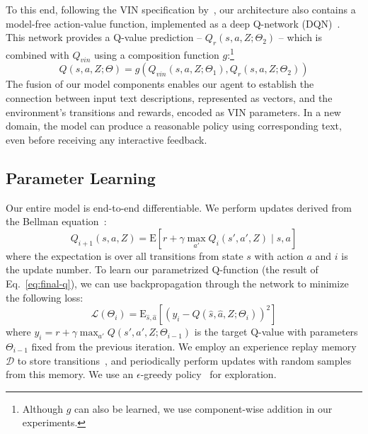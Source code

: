To this end, following the VIN specification by~, our architecture also contains a model-free action-value function, implemented as a deep Q-network (DQN)~\cite{mnih2015dqn}. This network provides a Q-value prediction -- $Q_{r} (s,a,Z; \Theta_2)$ -- which is combined with $Q_{vin}$ using a composition function $g$:\footnote{Although $g$ can also be learned, we use component-wise addition in our experiments.}
\begin{dmath}
Q(s, a, Z; \Theta) = g(Q_{vin}(s, a, Z; \Theta_1), Q_{r}(s, a, Z; \Theta_2))
\label{eq:final-q}
\end{dmath}
The fusion of our model components enables our agent to establish the connection between input text descriptions, represented as vectors, and the environment's transitions and rewards, encoded as VIN parameters. In a new domain, the model can produce a reasonable policy using corresponding text, even before receiving any interactive feedback.


\subsection{Parameter Learning}
Our entire model is end-to-end differentiable. We perform updates derived from the Bellman equation~\cite{sutton1998introduction}:
\begin{dmath}
	{Q_{i+1}(s,a, Z) = \mathrm{E}[r + \gamma \max_{a'} Q_i(s',a', Z) \mid s, a]} 
\label{eq:transfer-bellman-update}
\end{dmath}
where the expectation is over all transitions from state $s$ with action $a$ and $i$ is the update number. To learn our parametrized Q-function (the result of Eq.~\ref{eq:final-q}), we can use backpropagation through the network to minimize the following loss:
\begin{dmath}
	{\mathcal{L}(\Theta_i) = \mathrm{E}_{\hat{s},\hat{a}}  [ (y_i - Q(\hat{s}, \hat{a}, Z ; \Theta_i))^2 ]}
\label{eq:transfer-loss}
\end{dmath}
where $ {y_i = r + \gamma \max_{a'} Q (s',a', Z; \Theta_{i-1})}$ is the target Q-value with parameters $\Theta_{i-1}$ fixed from the previous iteration.  We employ an experience replay memory $\mathcal{D}$ to store transitions~\cite{mnih2015dqn}, and periodically perform updates with random samples from this memory. We use an $\epsilon$-greedy policy~\cite{sutton1998introduction} for exploration.  

